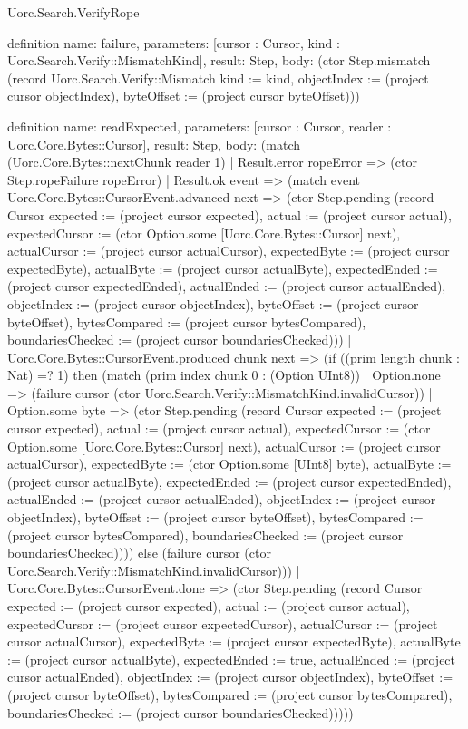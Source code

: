 \begin{lexlean}{Uorc.Search.VerifyRope}
\begin{semanticmodule}
definition{
  name: failure,
  parameters: [cursor : Cursor, kind : Uorc.Search.Verify::MismatchKind],
  result: Step,
  body: (ctor Step.mismatch (record Uorc.Search.Verify::Mismatch {kind := kind, objectIndex := (project cursor objectIndex), byteOffset := (project cursor byteOffset)}))
}

definition{
  name: readExpected,
  parameters: [cursor : Cursor, reader : Uorc.Core.Bytes::Cursor],
  result: Step,
  body: (match (Uorc.Core.Bytes::nextChunk reader 1)
    | Result.error ropeError => (ctor Step.ropeFailure ropeError)
    | Result.ok event => (match event
      | Uorc.Core.Bytes::CursorEvent.advanced next => (ctor Step.pending (record Cursor {expected := (project cursor expected), actual := (project cursor actual), expectedCursor := (ctor Option.some [Uorc.Core.Bytes::Cursor] next), actualCursor := (project cursor actualCursor), expectedByte := (project cursor expectedByte), actualByte := (project cursor actualByte), expectedEnded := (project cursor expectedEnded), actualEnded := (project cursor actualEnded), objectIndex := (project cursor objectIndex), byteOffset := (project cursor byteOffset), bytesCompared := (project cursor bytesCompared), boundariesChecked := (project cursor boundariesChecked)}))
      | Uorc.Core.Bytes::CursorEvent.produced chunk next => (if ((prim length chunk : Nat) =? 1) then (match (prim index chunk 0 : (Option UInt8))
        | Option.none => (failure cursor (ctor Uorc.Search.Verify::MismatchKind.invalidCursor))
        | Option.some byte => (ctor Step.pending (record Cursor {expected := (project cursor expected), actual := (project cursor actual), expectedCursor := (ctor Option.some [Uorc.Core.Bytes::Cursor] next), actualCursor := (project cursor actualCursor), expectedByte := (ctor Option.some [UInt8] byte), actualByte := (project cursor actualByte), expectedEnded := (project cursor expectedEnded), actualEnded := (project cursor actualEnded), objectIndex := (project cursor objectIndex), byteOffset := (project cursor byteOffset), bytesCompared := (project cursor bytesCompared), boundariesChecked := (project cursor boundariesChecked)}))) else (failure cursor (ctor Uorc.Search.Verify::MismatchKind.invalidCursor)))
      | Uorc.Core.Bytes::CursorEvent.done => (ctor Step.pending (record Cursor {expected := (project cursor expected), actual := (project cursor actual), expectedCursor := (project cursor expectedCursor), actualCursor := (project cursor actualCursor), expectedByte := (project cursor expectedByte), actualByte := (project cursor actualByte), expectedEnded := true, actualEnded := (project cursor actualEnded), objectIndex := (project cursor objectIndex), byteOffset := (project cursor byteOffset), bytesCompared := (project cursor bytesCompared), boundariesChecked := (project cursor boundariesChecked)}))))
}


\end{semanticmodule}
\end{lexlean}
